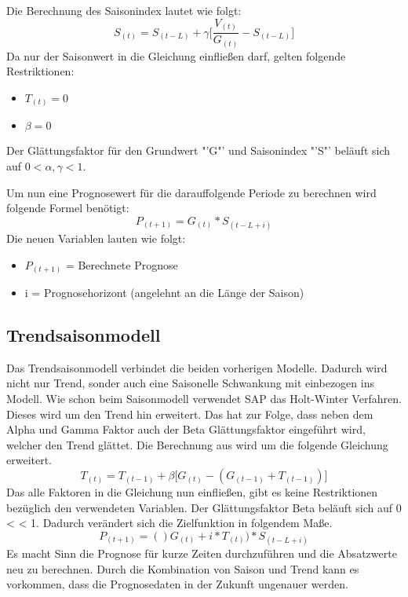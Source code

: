 Die Berechnung des Saisonindex lautet wie folgt:
\begin{equation}
	S_{(t)} = S_{(t-L)} + \gamma \big[\dfrac{V_{(t)}}{G_{(t)}} - S_{(t-L)} \big]
\end{equation}
Da nur der Saisonwert in die Gleichung einfließen darf, gelten folgende Restriktionen:
\begin{itemize}
	\item $T_{(t)} = 0$
	\item $\beta = 0$	
\end{itemize}
Der Glättungsfaktor für den Grundwert "'G"' und Saisonindex "'S"' beläuft sich auf $0 < \alpha, \gamma < 1$.

Um nun eine Prognosewert für die darauffolgende Periode zu berechnen wird folgende Formel benötigt:
\begin{equation}
	P_{(t+1)} = G_{(t)} * S_{(t-L+i)}
\end{equation}
Die neuen Variablen lauten wie folgt:
\begin{itemize}
	\item $P_{(t+1)}$ = Berechnete Prognose
	\item i = Prognosehorizont (angelehnt an die Länge der Saison)
\end{itemize}

\subsection{Trendsaisonmodell}
Das Trendsaisonmodell verbindet die beiden vorherigen Modelle. Dadurch wird nicht nur Trend, sonder auch eine Saisonelle Schwankung mit einbezogen ins Modell.
Wie schon beim Saisonmodell verwendet SAP das Holt-Winter Verfahren. Dieses wird um den Trend hin erweitert. Das hat zur Folge, dass neben dem Alpha und Gamma Faktor auch der Beta Glättungsfaktor eingeführt wird, welcher den Trend glättet. Die Berechnung aus  wird um die folgende Gleichung erweitert.
\begin{equation}
	T_{(t)} = T_{(t-1)} + \beta \big[G_{(t)} - (G_{(t-1)} + T_{(t-1)}) \big]
\end{equation}
Das alle Faktoren in die Gleichung nun einfließen, gibt es keine Restriktionen bezüglich den verwendeten Variablen. Der Glättungsfaktor Beta beläuft sich auf 0 < \beta < 1. Dadurch verändert sich die Zielfunktion in folgendem Maße.
\begin{equation}
	P_{(t+1)} = ()G_{(t)} + i * T_{(t)}) * S_{(t-L+i)}
\end{equation}
Es macht Sinn die Prognose für kurze Zeiten durchzuführen und die Absatzwerte neu zu berechnen. Durch die Kombination von Saison und Trend kann es vorkommen, dass die Prognosedaten in der Zukunft ungenauer werden.

